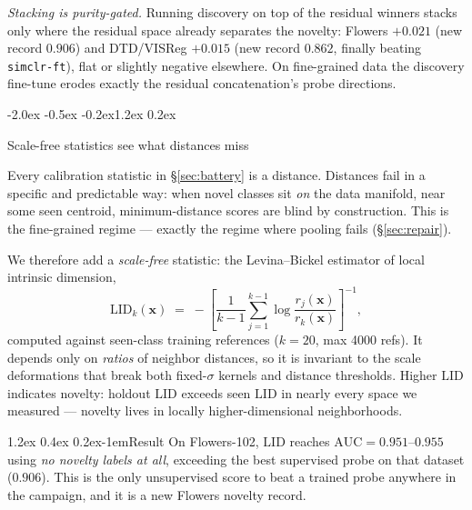 \documentclass{article}
\makeatletter
\renewcommand\section{\@startsection{section}{1}{\z@}%
  {-2.0ex \@plus -0.5ex \@minus -0.2ex}{1.2ex \@plus 0.2ex}%
  {\large\bf\raggedright}}
\renewcommand\paragraph{\@startsection{paragraph}{4}{\z@}%
  {1.2ex \@plus 0.4ex \@minus 0.2ex}{-1em}{\normalsize\bf}}
\newcommand{\x}{\mathbf{x}}
\newcommand{\lid}{\mathrm{LID}}
\newcommand{\auc}{\mathrm{AUC}}
\makeatother
\begin{document}
\emph{Stacking is purity-gated.} Running discovery on top of the residual
winners stacks only where the residual space already separates the novelty:
Flowers $+0.021$ (new record $0.906$) and DTD/VISReg $+0.015$ (new record
$0.862$, finally beating \texttt{simclr-ft}), flat or slightly negative
elsewhere. On fine-grained data the discovery fine-tune erodes exactly the
residual concatenation's probe directions.

\section{Scale-free statistics see what distances miss}
\label{sec:lid}

Every calibration statistic in \S\ref{sec:battery} is a distance. Distances
fail in a specific and predictable way: when novel classes sit \emph{on} the
data manifold, near some seen centroid, minimum-distance scores are blind by
construction. This is the fine-grained regime --- exactly the regime where
pooling fails (\S\ref{sec:repair}).

We therefore add a \emph{scale-free} statistic: the Levina--Bickel estimator of
local intrinsic dimension,
\begin{equation}
\lid_k(\x) \;=\; -\left[\frac{1}{k-1}\sum_{j=1}^{k-1}
\log\frac{r_j(\x)}{r_k(\x)}\right]^{-1},
\end{equation}
computed against seen-class training references ($k=20$, max 4000 refs). It
depends only on \emph{ratios} of neighbor distances, so it is invariant to the
scale deformations that break both fixed-$\sigma$ kernels and distance
thresholds. Higher $\lid$ indicates novelty: holdout $\lid$ exceeds seen $\lid$
in nearly every space we measured --- novelty lives in locally
higher-dimensional neighborhoods.

\paragraph{Result}
On Flowers-102, $\lid$ reaches $\auc=0.951$--$0.955$ using \emph{no novelty
labels at all}, exceeding the best supervised probe on that dataset ($0.906$).
This is the only unsupervised score to beat a trained probe anywhere in the
campaign, and it is a new Flowers novelty record.
\end{document}
